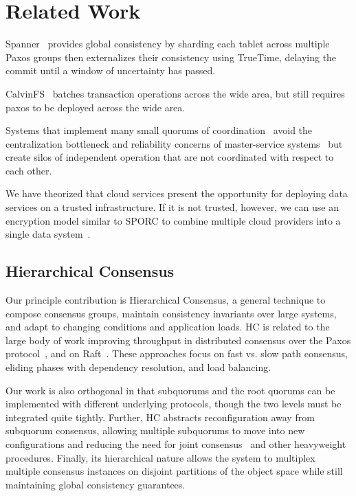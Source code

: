 
\renewcommand{\thechapter}{7}

\chapter{Related Work}
\label{ch:related_work}

Spanner~\cite{spanner} provides global consistency by sharding each tablet across multiple Paxos groups then externalizes their consistency using TrueTime, delaying the commit until a window of uncertainty has passed.

CalvinFS~\cite{calvindb,calvinfs} batches transaction operations across the wide area, but still requires paxos to be deployed across the wide area.

Systems that implement many small quorums of
coordination~\cite{mdcc,scatter,spanner} avoid the centralization bottleneck
and reliability concerns of master-service
systems~\cite{gray_dangers_1996,gfs} but create silos of independent
operation that are not coordinated with respect to each other.

We have theorized that cloud services present the opportunity for deploying data services on a trusted infrastructure. If it is not trusted, however, we can use an encryption model similar to SPORC to combine multiple cloud providers into a single data system~\cite{sporc}. 

\section{Hierarchical Consensus}

Our principle contribution is Hierarchical Consensus, a general technique to compose consensus groups, maintain consistency invariants over large systems, and adapt to changing conditions and application loads.
HC is related to the large body of work improving throughput in distributed consensus over the Paxos protocol~\cite{paxos,epaxos,fexible_paxos,generalized_paxos}, and on Raft~\cite{raft,raft_refloated}.
These approaches focus on fast vs. slow path consensus, eliding phases with dependency resolution, and load balancing.

Our work is also orthogonal in that subquorums and the root quorums can be implemented with different underlying protocols, though the two levels must be integrated quite tightly.
Further, HC abstracts reconfiguration away from subquorum consensus, allowing multiple subquorums to move into new configurations and reducing the need for joint consensus~\cite{raft} and other heavyweight procedures.
Finally, its hierarchical nature allows the system to multiplex multiple consensus instances on disjoint partitions of the object space while still maintaining global consistency guarantees.

